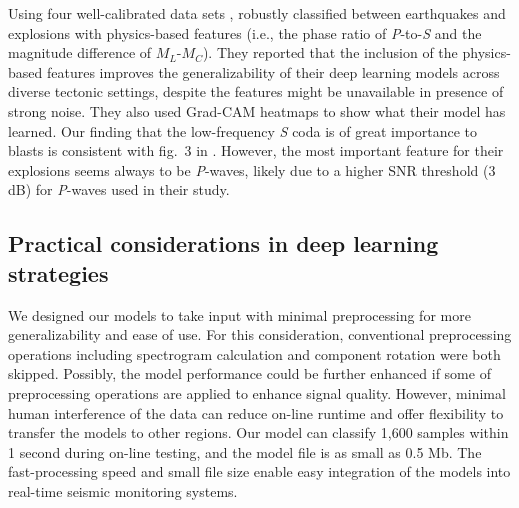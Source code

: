 \documentclass{gji}
\begin{document}
Using four well-calibrated data sets \citep{wang_grl}, \cite{kong} robustly classified between earthquakes and explosions with physics-based features (i.e., the phase ratio of \textit{P}-to-\textit{S} and the magnitude difference of $M_L$-$M_C$). They reported that the inclusion of the physics-based features improves the generalizability of their deep learning models across diverse tectonic settings, despite the features might be unavailable in presence of strong noise. They also used Grad-CAM heatmaps to show what their model has learned. Our finding that the low-frequency \textit{S} coda is of great importance to blasts is consistent with fig.~3 in \cite{kong}. However, the most important feature for their explosions seems always to be \textit{P}-waves, likely due to a higher SNR threshold (3 dB) for \textit{P}-waves used in their study.

\subsection{Practical considerations in deep learning strategies}
We designed our models to take input with minimal preprocessing for more generalizability and ease of use. For this consideration, conventional preprocessing operations including spectrogram calculation and component rotation were both skipped. Possibly, the model performance could be further enhanced if some of preprocessing operations are applied to enhance signal quality. However, minimal human interference of the data can reduce on-line runtime and offer flexibility to transfer the models to other regions. Our model can classify 1,600 samples within 1 second during on-line testing, and the model file is as small as 0.5 Mb. The fast-processing speed and small file size enable easy integration of the models into real-time seismic monitoring systems.
\end{document}
